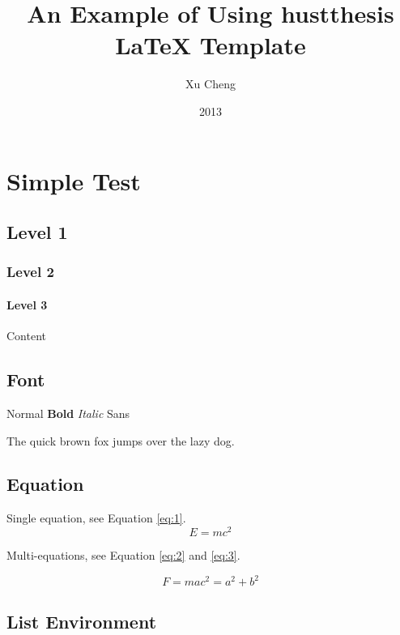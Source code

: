\documentclass[degree=bachelor]{hustthesis-en}
\title{An Example of Using hustthesis \LaTeX{} Template}
\author{Xu Cheng}
\date{2013}{6}{1}
\begin{document}
\frontmatter
\maketitle
\makeabstract
\tableofcontents
\listoffigures
\listoftables
\mainmatter

\chapter{Simple Test}

\section{Level 1}
\subsection{Level 2}
\subsubsection{Level 3}
Content

\section{Font}

Normal \textbf{Bold} \emph{Italic} \textsf{Sans}

The quick brown fox jumps over the lazy dog.

\section{Equation}

Single equation, see Equation \ref{eq:1}.
\begin{equation}
  E = mc^2 \label{eq:1}
\end{equation}

Multi-equations, see Equation \ref{eq:2} and \ref{eq:3}.

\begin{subequations}
\begin{equation}
  F = ma \label{eq:2}
\end{equation}
\begin{equation}
  c^2 = a^2 + b^2 \label{eq:3}
\end{equation}
\end{subequations}

\section{List Environment}
\end{document}
